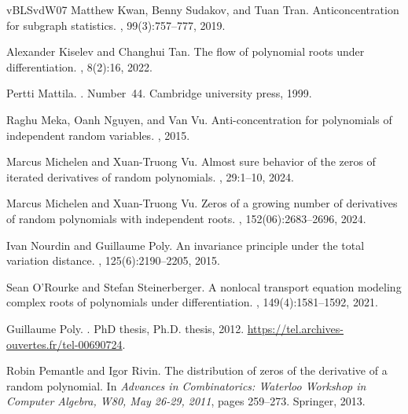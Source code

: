 \documentclass[12pt, reqno]{amsart}
\theoremstyle{plain}
\theoremstyle{definition}
\begin{document}
\begin{thebibliography}{vBLSvdW07}
Matthew Kwan, Benny Sudakov, and Tuan Tran.
\newblock Anticoncentration for subgraph statistics.
, 99(3):757--777,
  2019.

Alexander Kiselev and Changhui Tan.
\newblock The flow of polynomial roots under differentiation.
, 8(2):16, 2022.

Pertti Mattila.
.
\newblock Number~44. Cambridge university press, 1999.

Raghu Meka, Oanh Nguyen, and Van Vu.
\newblock Anti-concentration for polynomials of independent random variables.
, 2015.

Marcus Michelen and Xuan-Truong Vu.
\newblock Almost sure behavior of the zeros of iterated derivatives of random
  polynomials.
, 29:1--10, 2024.

Marcus Michelen and Xuan-Truong Vu.
\newblock Zeros of a growing number of derivatives of random polynomials with
  independent roots.
,
  152(06):2683--2696, 2024.

Ivan Nourdin and Guillaume Poly.
\newblock An invariance principle under the total variation distance.
, 125(6):2190--2205,
  2015.

Sean O’Rourke and Stefan Steinerberger.
\newblock A nonlocal transport equation modeling complex roots of polynomials
  under differentiation.
,
  149(4):1581--1592, 2021.

Guillaume Poly.
.
\newblock PhD thesis, Ph.D. thesis, 2012.
\newblock \url{https://tel.archives-ouvertes.fr/tel-00690724}.

Robin Pemantle and Igor Rivin.
\newblock The distribution of zeros of the derivative of a random polynomial.
\newblock In {\em Advances in Combinatorics: Waterloo Workshop in Computer
  Algebra, W80, May 26-29, 2011}, pages 259--273. Springer, 2013.


\end{thebibliography}
\end{document}
